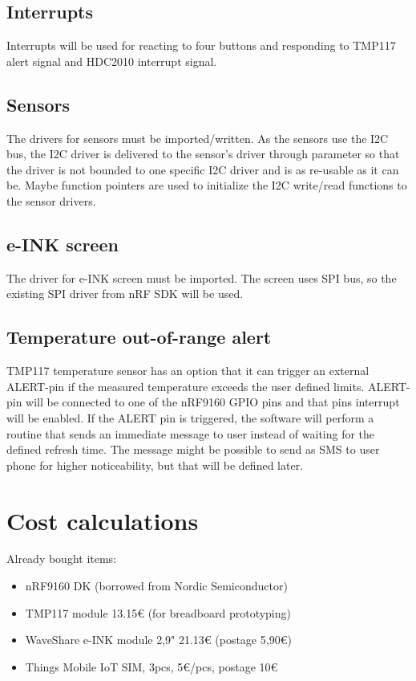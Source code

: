 \documentclass[]{dithesis}
\begin{document}
\subsection{Interrupts}

Interrupts will be used for reacting to four buttons and responding to TMP117 alert signal and HDC2010 interrupt signal.

\subsection{Sensors}

The drivers for sensors must be imported/written. As the sensors use the I2C bus, the I2C driver is delivered to the sensor's driver through parameter so that the driver is not bounded to one specific I2C driver and is as re-usable as it can be. Maybe function pointers are used to initialize the I2C write/read functions to the sensor drivers. 

\subsection{e-INK screen}

The driver for e-INK screen must be imported. The screen uses SPI bus, so the existing SPI driver from nRF SDK will be used.

\subsection{Temperature out-of-range alert}

TMP117 temperature sensor has an option that it can trigger an external ALERT-pin if the measured temperature exceeds the user defined limits. ALERT-pin will be connected to one of the nRF9160 GPIO pins and that pins interrupt will be enabled. If the ALERT pin is triggered, the software will perform a routine that sends an immediate message to user instead of waiting for the defined refresh time. The message might be possible to send as SMS to user phone for higher noticeability, but that will be defined later. 

\section{Cost calculations}

Already bought items:
\begin{itemize}
    \item nRF9160 DK (borrowed from Nordic Semiconductor)
    \item TMP117 module 13.15€ (for breadboard prototyping)
    \item WaveShare e-INK module 2,9" 21.13€ (postage 5,90€)
    \item Things Mobile IoT SIM, 3pcs, 5€/pcs, postage 10€
\end{itemize}
\end{document}
